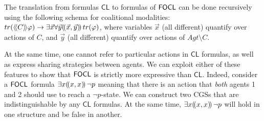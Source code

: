 \documentclass{article}
\begin{document}
The translation from formulas $\mathsf{CL}$ to formulas of $\mathsf{FOCL}$ can be done recursively using the following schema for coalitional modalities: 
$tr(\langle \! \langle C \rangle \! \rangle \varphi) \to \exists \vec x \forall \vec y (\!( \vec x, \vec y )\!)\, tr(\varphi)$, 
where variables $\vec x$ (all different) quantify over actions of $C$, and $\vec y$ (all different) quantify over actions of $Agt \setminus C$. 

At the same time, one cannot refer to particular actions in $\mathsf{CL}$ formulas, as well as express sharing strategies between agents. We can exploit either of these features to show that $\mathsf{FOCL}$ is strictly more expressive than $\mathsf{CL}$. 
Indeed, consider a $\mathsf{FOCL}$ formula $\exists x (\!( x, x )\!)\, \lnot p$ meaning that there is an action that \textit{both} agents 1 and 2 should use to reach a $\lnot p$-state. We can construct two CGSs that are indistinguishable by any $\mathsf{CL}$ formulas. At the same time,   $\exists x (\!( x, x )\!)\, \lnot p$ will hold in one structure and be false in another. 
\end{document}
